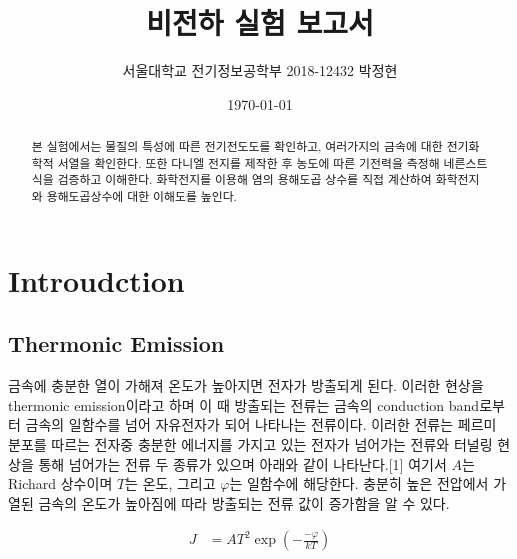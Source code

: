 \documentclass[%
 reprint,
 amsmath,amssymb,
 aps,
]{revtex4-2}
\begin{document}
\title{비전하 실험 보고서}

\author{서울대학교 전기정보공학부 2018-12432 박정현}
\date{\today}%

\begin{abstract}
본 실험에서는 물질의 특성에 따른 전기전도도를 확인하고, 여러가지의 금속에 대한 전기화학적 서열을 확인한다. 또한 다니엘 전지를 제작한 후 농도에 따른 기전력을 측정해 네른스트 식을 검증하고 이해한다. 화학전지를 이용해 염의 용해도곱 상수를 직접 계산하여 화학전지와 용해도곱상수에 대한 이해도를 높인다. 
\end{abstract}

\maketitle


\section{\label{sec:level1}Introudction}
\subsection{\label{sec:level2}Thermonic Emission}
금속에 충분한 열이 가해져 온도가 높아지면 전자가 방출되게 된다. 이러한 현상을 thermonic emission이라고 하며 이 때 방출되는 전류는 금속의 conduction band로부터 금속의 일함수를 넘어 자유전자가 되어 나타나는 전류이다. 이러한 전류는 페르미 분포를 따르는 전자중 충분한 에너지를 가지고 있는 전자가 넘어가는 전류와 터널링 현상을 통해 넘어가는 전류 두 종류가 있으며 아래와 같이 나타난다.[1] 여기서 $A$는 Richard 상수이며 $T$는 온도, 그리고 $\varphi$는 일함수에 해당한다. 충분히 높은 전압에서 가열된 금속의 온도가 높아짐에 따라 방출되는 전류 값이 증가함을 알 수 있다.

\begin{align}
	J &= AT^{2}\exp\left(-\frac{-\varphi}{kT}\right)
\end{align}
\end{document}
